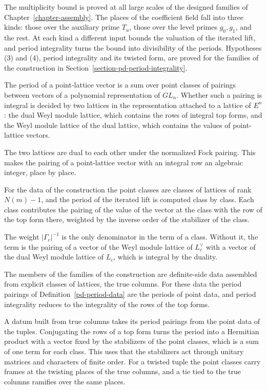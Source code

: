 The multiplicity bound is proved at all large scales of the designed families of
Chapter~\ref{chapter-assembly}. The places of the coefficient field fall into three kinds: those
over the auxiliary prime $T_u$, those over the level primes $g_0,g_1$, and the rest. At each kind
a different input bounds the valuation of the iterated lift, and period integrality turns the
bound into divisibility of the periods. Hypotheses (3) and (4), period integrality and its twisted
form, are proved for the families of the construction in
Section~\ref{section-pd-period-integrality}.

The period of a point-lattice vector is a sum over point classes of pairings between vectors of a
polynomial representation of $GL_n$. Whether such a pairing is integral is decided by two lattices
in the representation attached to a lattice of $E^n$: the dual Weyl module lattice, which contains
the rows of integral top forms, and the Weyl module lattice of the dual lattice, which contains the
values of point-lattice vectors.

The two lattices are dual to each other under the normalized Fock pairing. This makes the pairing
of a point-lattice vector with an integral row an algebraic integer, place by place.

For the data of the construction the point classes are classes of lattices of rank $N(m)-1$, and
the period of the iterated lift is computed class by class. Each class contributes the pairing of
the value of the vector at the class with the row of the top form there, weighted by the inverse
order of the stabilizer of the class.

The weight $|\Gamma_c|^{-1}$ is the only denominator in the term of a class. Without it, the term is
the pairing of a vector of the Weyl module lattice of $L_c^\vee$ with a vector of the dual Weyl
module lattice of $L_c$, which is integral by the duality.

The members of the families of the construction are definite-side data assembled from explicit
classes of lattices, the true columns. For these data the period pairings of
Definition~\ref{pd-period-data} are the periods of point data, and period integrality reduces to
the integrality of the rows of the top forms.

A datum built from true columns takes its period pairings from the point data of the tuples.
Conjugating the rows of a top form turns the period into a Hermitian product with a vector fixed by
the stabilizers of the point classes, which is a sum of one term for each class. This uses that the
stabilizers act through unitary matrices and characters of finite order. For a twisted tuple the
point classes carry frames at the twisting places of the true columns, and a tie tied to the true
columns ramifies over the same places.

